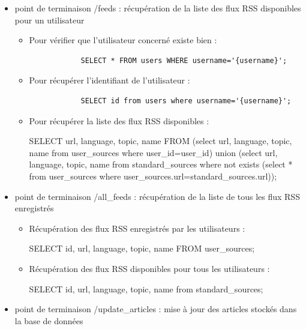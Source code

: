 \documentclass[french]{article}
\begin{document}
    \begin{itemize}
        \item point de terminaison /feeds : récupération de la liste des flux RSS disponibles pour un utilisateur
        \begin{itemize}
            \item Pour vérifier que l'utilisateur concerné existe bien :
            \begin{verbatim}
            SELECT * FROM users WHERE username='{username}';
            \end{verbatim}
            \item Pour récupérer l'identifiant de l'utilisateur :
            \begin{verbatim}
            SELECT id from users where username='{username}';
            \end{verbatim}
            \item Pour récupérer la liste des flux RSS disponibles :
            \begin{spverbatim}
            SELECT url, language, topic, name FROM (select url, language, topic, name from user_sources where user_id={user_id}) union  (select url, language, topic, name from standard_sources where not exists (select * from user_sources where user_sources.url=standard_sources.url));
            \end{spverbatim}
        \end{itemize}
        \item point de terminaison /all\_feeds : récupération de la liste de tous les flux RSS enregistrés
        \begin{itemize}
            \item Récupération des flux RSS enregistrés par les utilisateurs :
            \begin{spverbatim}
            SELECT id, url, language, topic, name FROM user_sources;
            \end{spverbatim}
            \item Récupération des flux RSS disponibles pour tous les utilisateurs :
            \begin{spverbatim}
            SELECT id, url, language, topic, name from standard_sources;
            \end{spverbatim}
        \end{itemize}
        \item point de terminaison /update\_articles : mise à jour des articles stockés dans la base de données
        \begin{itemize}

\end{itemize}
\end{itemize}
\end{document}
